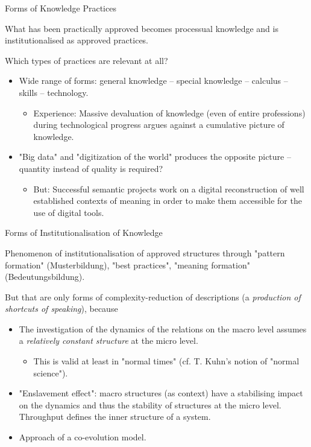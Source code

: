 \documentclass{beamer}
\begin{document}
\begin{frame}{Forms of Knowledge Practices}
  
What has been practically approved becomes processual knowledge and is
institutionalised as approved practices.

Which types of practices are relevant at all?
\begin{itemize}
\item Wide range of forms: general knowledge -- special knowledge -- calculus
  -- skills -- technology.
  \begin{itemize}
  \item Experience: Massive devaluation of knowledge (even of entire
    professions) during technological progress argues against a cumulative
    picture of knowledge.
  \end{itemize}
\item "Big data" and "digitization of the world" produces the opposite picture
  -- quantity instead of quality is required?
  \begin{itemize}
  \item But: Successful semantic projects work on a digital reconstruction of
    well established contexts of meaning in order to make them accessible for
    the use of digital tools.
  \end{itemize}
\end{itemize}
\end{frame}
\begin{frame}{Forms of Institutionalisation of Knowledge}
  
Phenomenon of institutionalisation of approved structures through "pattern
formation" (Musterbildung), "best practices", "meaning formation"
(Bedeutungsbildung).

But that are only forms of complexity-reduction of descriptions (a
\emph{production of shortcuts of speaking}), because\vspace{-1em}
\begin{itemize}
\item The investigation of the dynamics of the relations on the macro level
  assumes a \emph{relatively constant structure} at the micro level.
  \begin{itemize}
  \item This is valid at least in "normal times" (cf. T. Kuhn's notion of 
    "normal science").
  \end{itemize}
\item "Enslavement effect": macro structures (as context) have a stabilising
  impact on the dynamics and thus the stability of structures at the micro
  level.  Throughput defines the inner structure of a system.  
\item Approach of a co-evolution model.
\end{itemize}
\end{frame}
\end{document}
